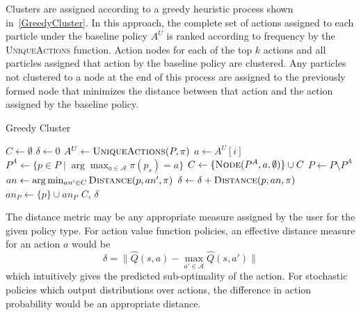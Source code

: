 \documentclass[letterpaper]{article} %
\begin{document}
Clusters are assigned according to a greedy heuristic process shown in~\cref{GreedyCluster}.
In this approach, the complete set of actions assigned to each particle under the baseline policy $A^U$ is ranked according to frequency by the \textsc{UniqueActions} function.
Action nodes for each of the top $k$ actions and all particles assigned that action by the baseline policy are clustered.
Any particles not clustered to a node at the end of this process are assigned to the previously formed node that minimizes the distance between that action and the action assigned by the baseline policy.
\begin{algorithm}[ht]
\caption{Greedy Cluster}\label{GreedyCluster}
\begin{algorithmic}[1]
        \State $C \gets \emptyset$
        \State $\delta \gets 0$
        \State $A^U \gets \textsc{UniqueActions}(P, \pi)$
            \State $a \gets A^U[i]$
            \State $P^A \gets \{ p \in P \mid \arg\max_{a \in \mathcal{A}}\pi(p_s) = a \}$
            \State $C \gets \{ \textsc{Node}(P^A, a, \emptyset) \} \cup C$
            \State $P \gets P \setminus P^A$
        \EndFor
            \State $an \gets \arg\min_{an' \in C} \textsc{Distance}(p, an', \pi)$
            \State $\delta \gets \delta + \textsc{Distance}(p, an, \pi)$
            \State $an_P \gets \{ p \} \cup an_P$
        \EndFor
        \State \Return $C$, $\delta$
    \EndProcedure
\end{algorithmic}
\end{algorithm}

The distance metric may be any appropriate measure assigned by the user for the given policy type.
For action value function policies, an effective distance measure for an action $a$ would be
\begin{equation}\label{eq: delta dqn}
    \delta = \| \hat{Q}(s, a) - \max_{a' \in \mathcal{A}} \hat{Q}(s, a') \|
\end{equation}
which intuitively gives the predicted sub-optimality of the action.
For stochastic policies which output distributions over actions, the difference in action probability would be an appropriate distance.
\end{document}
